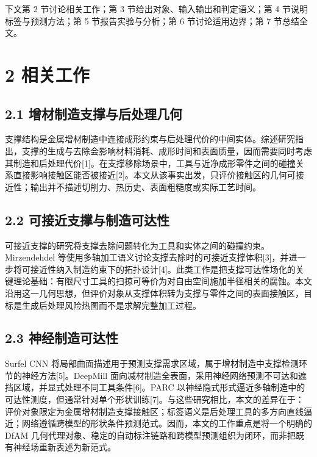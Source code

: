 下文第 2 节讨论相关工作；第 3 节给出对象、输入输出和判定语义；第 4 节说明标签与预测方法；第 5 节报告实验与分析；第 6 节讨论适用边界；第 7 节总结全文。

\section{2 相关工作}\label{ux76f8ux5173ux5de5ux4f5c}

\subsection{2.1 增材制造支撑与后处理几何}\label{ux589eux6750ux5236ux9020ux652fux6491ux4e0eux540eux5904ux7406ux51e0ux4f55}

支撑结构是金属增材制造中连接成形约束与后处理代价的中间实体。综述研究指出，支撑的生成与去除会影响材料消耗、成形时间和表面质量，因而需要同时考虑其制造和后处理代价{[}1{]}。在支撑移除场景中，工具与近净成形零件之间的碰撞关系直接影响接触区能否被接近{[}2{]}。本文从该事实出发，只评价接触区的几何可接近性；输出并不描述切削力、热历史、表面粗糙度或实际工艺时间。

\subsection{2.2 可接近支撑与制造可达性}\label{ux53efux63a5ux8fd1ux652fux6491ux4e0eux5236ux9020ux53efux8fbeux6027}

可接近支撑的研究将支撑去除问题转化为工具和实体之间的碰撞约束。Mirzendehdel 等使用多轴加工语义讨论支撑去除时的可接近支撑体积{[}3{]}，并进一步将可接近性纳入制造约束下的拓扑设计{[}4{]}。此类工作是把支撑可达性场化的关键理论基础：有限尺寸工具的扫掠可等价为对自由空间施加半径相关的腐蚀。本文沿用这一几何思想，但评价对象从支撑体积转为支撑与零件之间的表面接触区，目标是生成后处理风险热图而不是求解完整加工过程。

\subsection{2.3 神经制造可达性}\label{ux795eux7ecfux5236ux9020ux53efux8fbeux6027}

Surfel CNN 将局部曲面描述用于预测支撑需求区域，属于增材制造中支撑检测环节的神经方法{[}5{]}。DeepMill 面向减材制造全表面，采用神经网络预测不可达和遮挡区域，并显式处理不同工具条件{[}6{]}。PARC 以神经隐式形式逼近多轴制造中的可达性测度，但通常针对单个形状训练{[}7{]}。与这些研究相比，本文的差异在于：评价对象限定为金属增材制造支撑接触区；标签语义是后处理工具的多方向直线逼近；网络遵循跨模型的形状条件预测范式。因而，本文的工作重点是将一个明确的 DfAM 几何代理对象、稳定的自动标注链路和跨模型预测组织为闭环，而非把既有神经场重新表述为新范式。

